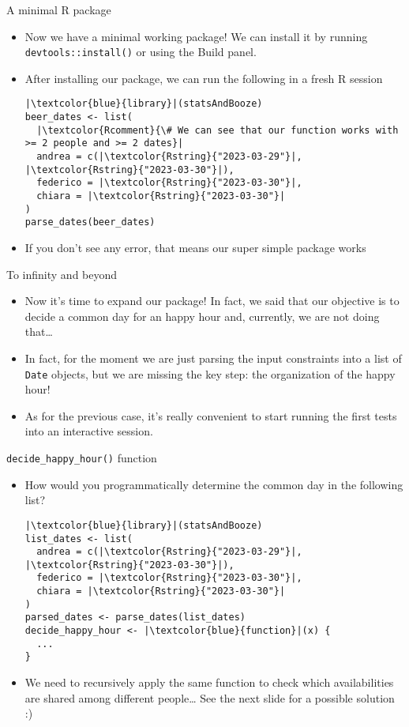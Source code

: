 \documentclass[
hyperref={bookmarks=false},
xcolor={dvipsnames,svgnames*,x11names*}, 
12pt
]{beamer}
\begin{document}
\begin{frame}[fragile]{A minimal R package}
\vspace{-0.5cm}
\begin{itemize}
\itemsep 2ex
\item Now we have a minimal working package! We can install it by running \texttt{devtools::install()} or using the Build panel. 
\item After installing our package, we can run the following in a fresh R session
\begin{lstlisting}
|\textcolor{blue}{library}|(statsAndBooze)
beer_dates <- list(
  |\textcolor{Rcomment}{\# We can see that our function works with >= 2 people and >= 2 dates}|
  andrea = c(|\textcolor{Rstring}{"2023-03-29"}|, |\textcolor{Rstring}{"2023-03-30"}|), 
  federico = |\textcolor{Rstring}{"2023-03-30"}|,
  chiara = |\textcolor{Rstring}{"2023-03-30"}|
)
parse_dates(beer_dates)
\end{lstlisting}
\item If you don't see any error, that means our super simple package works 
\end{itemize}
\end{frame}

\begin{frame}[fragile]{To infinity and beyond }
\vspace{-0.5cm}
\begin{itemize}
\itemsep 3ex
\item Now it's time to expand our package! In fact, we said that our objective is to decide a common day for an happy hour and, currently, we are not doing that\dots 
\item In fact, for the moment we are just parsing the input constraints into a list of \texttt{Date} objects, but we are missing the key step: the organization of the happy hour!  
\item As for the previous case, it's really convenient to start running the first tests into an interactive session. 
\end{itemize}
\end{frame}

\begin{frame}[fragile]{\texttt{decide\_happy\_hour()} function}
\vspace{-0.5cm}
\begin{itemize}
\item How would you programmatically determine the common day in the following list?
\begin{lstlisting}
|\textcolor{blue}{library}|(statsAndBooze)
list_dates <- list(
  andrea = c(|\textcolor{Rstring}{"2023-03-29"}|, |\textcolor{Rstring}{"2023-03-30"}|), 
  federico = |\textcolor{Rstring}{"2023-03-30"}|,
  chiara = |\textcolor{Rstring}{"2023-03-30"}|
)
parsed_dates <- parse_dates(list_dates)
decide_happy_hour <- |\textcolor{blue}{function}|(x) {
  ... 
}
\end{lstlisting}
\item We need to recursively apply the same function to check which availabilities are shared among different people\dots\; See the next slide for a possible solution :)
\end{itemize}
\end{frame}
\end{document}
